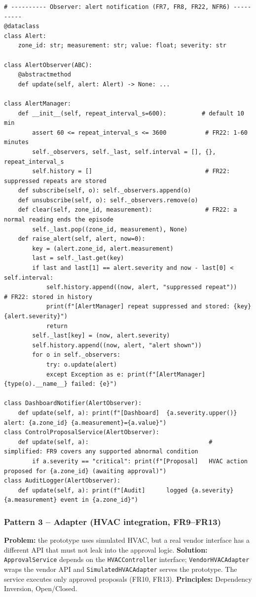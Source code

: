 \documentclass[11pt,a4paper]{article}
\newcommand{\code}[1]{\texttt{#1}}
\begin{document}
\begin{lstlisting}
# ---------- Observer: alert notification (FR7, FR8, FR22, NFR6) ----------
@dataclass
class Alert:
    zone_id: str; measurement: str; value: float; severity: str

class AlertObserver(ABC):
    @abstractmethod
    def update(self, alert: Alert) -> None: ...

class AlertManager:
    def __init__(self, repeat_interval_s=600):          # default 10 min
        assert 60 <= repeat_interval_s <= 3600           # FR22: 1-60 minutes
        self._observers, self._last, self.interval = [], {}, repeat_interval_s
        self.history = []                                # FR22: suppressed repeats are stored
    def subscribe(self, o): self._observers.append(o)
    def unsubscribe(self, o): self._observers.remove(o)
    def clear(self, zone_id, measurement):               # FR22: a normal reading ends the episode
        self._last.pop((zone_id, measurement), None)
    def raise_alert(self, alert, now=0):
        key = (alert.zone_id, alert.measurement)
        last = self._last.get(key)
        if last and last[1] == alert.severity and now - last[0] < self.interval:
            self.history.append((now, alert, "suppressed repeat"))               # FR22: stored in history
            print(f"[AlertManager] repeat suppressed and stored: {key} {alert.severity}")
            return
        self._last[key] = (now, alert.severity)
        self.history.append((now, alert, "alert shown"))
        for o in self._observers:
            try: o.update(alert)
            except Exception as e: print(f"[AlertManager] {type(o).__name__} failed: {e}")

class DashboardNotifier(AlertObserver):
    def update(self, a): print(f"[Dashboard]  {a.severity.upper()} alert: {a.zone_id} {a.measurement}={a.value}")
class ControlProposalService(AlertObserver):
    def update(self, a):                                  # simplified: FR9 covers any supported abnormal condition
        if a.severity == "critical": print(f"[Proposal]   HVAC action proposed for {a.zone_id} (awaiting approval)")
class AuditLogger(AlertObserver):
    def update(self, a): print(f"[Audit]      logged {a.severity} {a.measurement} event in {a.zone_id}")
\end{lstlisting}

\subsubsection*{Pattern 3 -- Adapter (HVAC integration, FR9--FR13)}
\textbf{Problem:} the prototype uses simulated HVAC, but a real vendor interface has a different API that must not leak into the approval logic. \textbf{Solution:} \code{ApprovalService} depends on the \code{HVACController} interface; \code{VendorHVACAdapter} wraps the vendor API and \code{SimulatedHVACAdapter} serves the prototype. The service executes only approved proposals (FR10, FR13). \textbf{Principles:} Dependency Inversion, Open/Closed.
\end{document}
